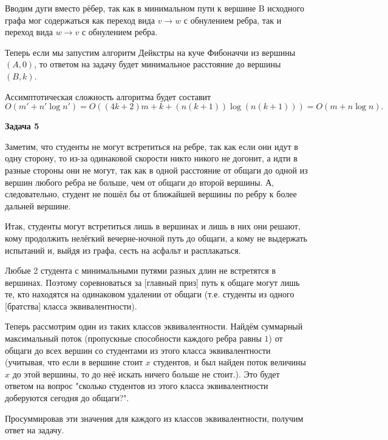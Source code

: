 \documentclass[12pt]{article}
\begin{document}
	Вводим дуги вместо рёбер, так как в минимальном пути к вершине B исходного графа мог содержаться как переход вида $ v \rightarrow w $ с обнулением ребра, так и переход вида $ w \rightarrow v $ с обнулением ребра.
	\newline
	
	Теперь если мы запустим алгоритм Дейкстры на куче Фибоначчи из вершины $ (A, 0) $, то ответом на задачу будет минимальное расстояние до вершины $ (B, k) $.
	
	Ассимптотическая сложность алгоритма будет составит
	$$ O(m' + n' \log{n'}) = O((4k + 2) m + k + (n (k + 1)) \log {(n (k + 1))}) = O(m + n \log{n}). $$
	
	\textbf{\large Задача 5}
	
	Заметим, что студенты не могут встретиться на ребре, так как если они идут в одну сторону, то из-за одинаковой скорости никто никого не догонит, а идти в разные стороны они не могут, так как в одной расстояние от общаги до одной из вершин любого ребра не больше, чем от общаги до второй вершины. А, следовательно, студент не пошёл бы от ближайшей вершины по ребру к более дальней вершине.
	
	Итак, студенты могут встретиться лишь в вершинах и лишь в них они решают, кому продолжить нелёгкий вечерне-ночной путь до общаги, а кому не выдержать испытаний и, выйдя из графа, сесть на асфальт и расплакаться.
	
	Любые 2 студента с минимальными путями разных длин не встретятся в вершинах. Поэтому соревноваться за [главный приз] путь к общаге могут лишь те, кто находятся на одинаковом удалении от общаги (т.е. студенты из одного [братства] класса эквивалентности).
	
	Теперь рассмотрим один из таких классов эквивалентности. Найдём суммарный максимальный поток (пропускные способности каждого ребра равны $ 1 $) от общаги до всех вершин со студентами из этого класса эквивалентности (учитывая, что если в вершине стоит $ x $ студентов, и был найден поток величины $ x $ до этой вершины, то до неё искать ничего больше не стоит.). Это будет ответом на вопрос "сколько студентов из этого класса эквивалентности доберуются сегодня до общаги?".
	
	Просуммировав эти значения для каждого из классов эквивалентности, получим ответ на задачу.
	\newline
	
\end{document}
